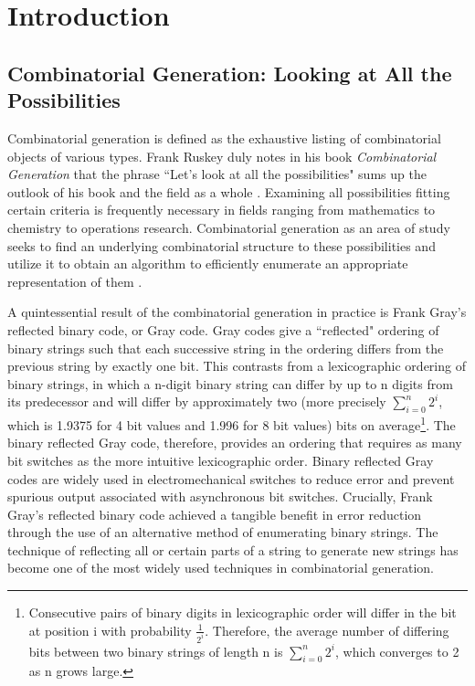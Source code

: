 \chapter{Introduction}

\section{Combinatorial Generation: Looking at All the Possibilities}

Combinatorial generation is defined as the exhaustive listing of combinatorial objects of various types.  Frank Ruskey duly notes in his book \emph{Combinatorial Generation} that the phrase ``Let's look at all the possibilities" sums up the outlook of his book and the field as a whole \cite{ruskey2003combinatorial}. Examining all possibilities fitting certain criteria is frequently necessary in fields ranging from mathematics to chemistry to operations research. Combinatorial generation as an area of study seeks to find an underlying combinatorial structure to these possibilities and utilize it to obtain an algorithm to efficiently enumerate an appropriate representation of them \cite{ruskey2003combinatorial}. 

A quintessential result of the combinatorial generation in practice is Frank Gray's reflected binary code, or Gray code. Gray codes give a ``reflected" ordering of binary strings such that each successive string in the ordering differs from the previous string by exactly one bit. This contrasts from a lexicographic ordering of binary strings, in which a n-digit binary string can differ by up to n digits from its predecessor and will differ by approximately two (more precisely $\sum_{i=0}^n2^i$, which is 1.9375 for 4 bit values and 1.996 for 8 bit values) bits on average\footnote{Consecutive pairs of binary digits in lexicographic order will differ in the bit at position i with probability $\frac{1}{2^i}$.  Therefore, the average number of differing bits between two binary strings of length n is $\sum_{i=0}^n2^i$, which converges to 2 as n grows large.}. The binary reflected Gray code, therefore, provides an ordering that requires as many bit switches as the more intuitive lexicographic order. Binary reflected Gray codes are widely used in electromechanical switches to reduce error and prevent spurious output associated with asynchronous bit switches. 
Crucially, Frank Gray's reflected binary code achieved a tangible benefit in error reduction through the use of an alternative method of enumerating binary strings.  The technique of reflecting all or certain parts of a string to generate new strings has become one of the most widely used techniques in combinatorial generation.


